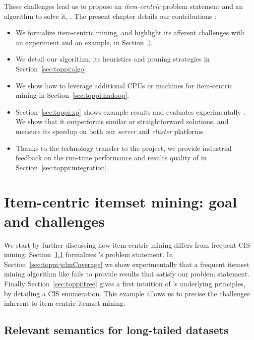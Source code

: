 These challenges lead us to propose an {\em item-centric} problem statement
and an algorithm to solve it, \toppi.
The present chapter details our contributions :

\begin{itemize}
	\item We formalize item-centric mining,
	and highlight its afferent challenges with an experiment and an example, in Section~\ref{sec:toppi:intro}.

	\item We detail our algorithm, its heuristics and pruning strategies
	in Section~\ref{sec:toppi:algo}.

	\item We show how to leverage additional CPUs or machines for item-centric mining in Section~\ref{sec:toppi:hadoop}.

	\item Section~\ref{sec:toppi:xp} shows example results and evaluates experimentally \toppi.
		We show that it outperforms similar or straightforward solutions,
		and measure its speedup on both our {\em server} and {\em cluster} platforms.

	\item Thanks to the technology transfer to the \datalyse project,
	 we provide industrial feedback on the run-time performance and results quality of \toppi
	 in Section~\ref{sec:toppi:integration}.
\end{itemize}





\section{Item-centric itemset mining: goal and challenges}
\label{sec:toppi:intro}

We start by further discussing how item-centric mining differs from frequent CIS mining.
Section~\ref{sec:toppi:statement} formalizes \toppi's problem statement.
In Section~\ref{sec:toppi:jclmCoverage} we show experimentally that a frequent itemset mining algorithm like \jlcm
fails to provide results that satisfy our problem statement.
Finally Section~\ref{sec:toppi:tree} gives a first intuition of \toppi's underlying principles,
by detailing a CIS enumeration.
This example allows us to precise the challenges inherent to item-centric itemset mining.


\subsection{Relevant semantics for long-tailed datasets}
\label{sec:toppi:statement}

